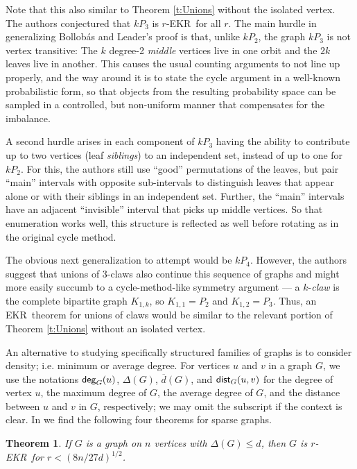 \documentclass{article}
\newtheorem{thm}{Theorem}%
\def\D{{\Delta}}
\def\od{{\overline{d}}}
\def\deg{{\sf deg}}
\def\dist{{\sf dist}}
\def\ekr{{\sf EKR}}
\begin{document}
Note that this also similar to Theorem \ref{t:Unions} without the isolated vertex.
The authors conjectured that $kP_3$ is $r$-\ekr\ for all $r$.
The main hurdle in generalizing Bollob\'as and Leader's proof is that, unlike $kP_2$, the graph $kP_3$ is not vertex transitive:
The $k$ degree-2 {\it middle} vertices live in one orbit and the $2k$ leaves live in another.
This causes the usual counting arguments to not line up properly, and the way around it is to state the cycle argument in a well-known probabilistic form, so that objects from the resulting probability space can be sampled in a controlled, but non-uniform manner that compensates for the imbalance.

A second hurdle arises in each component of $kP_3$ having the ability to contribute up to two vertices (leaf {\it siblings}) to an independent set, instead of up to one for $kP_2$.
For this, the authors still use ``good'' permutations of the leaves, but pair ``main'' intervals with opposite sub-intervals to distinguish leaves that appear alone or with their siblings in an independent set.
Further, the ``main'' intervals have an adjacent ``invisible'' interval that picks up middle vertices.
So that enumeration works well, this structure is reflected as well before rotating as in the original cycle method.

The obvious next generalization to attempt would be $kP_4$.
However, the authors suggest that unions of 3-claws also continue this sequence of graphs and might more easily succumb to a cycle-method-like symmetry argument --- a $k$-{\it claw} is the complete bipartite graph $K_{1,k}$, so $K_{1,1}=P_2$ and $K_{1,2}=P_3$.
Thus, an \ekr\ theorem for unions of claws would be similar to the relevant portion of Theorem \ref{t:Unions} without an isolated vertex.

An alternative to studying specifically structured families of graphs is to consider density; i.e. minimum or average degree.
For vertices $u$ and $v$ in a graph $G$, we use the notations $\deg_G(u)$, $\D(G)$, $\od(G)$, and $\dist_G(u,v)$ for the degree of vertex $u$, the maximum degree of $G$, the average degree of $G$, and the distance between $u$ and $v$ in $G$, respectively; we may omit the subscript if the context is clear.
In \cite{FranHurl} we find the following four theorems for sparse graphs.

\begin{thm}
\label{t:MaxDeg}
If $G$ is a graph on $n$ vertices with $\D(G)\le d$, then $G$ is $r$-\ekr\ for $r < (8n/27d)^{1/2}$. 
\end{thm}
\end{document}
